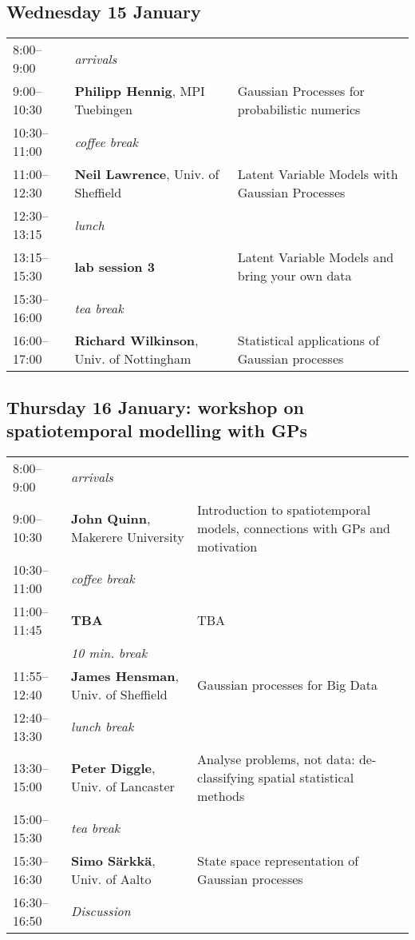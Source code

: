 \documentclass{article}
\begin{document}
\vspace{0.5cm}
\subsection*{\textcolor{MyDarkBlue}{Wednesday 15 January}}
\begin{tabular}{l p{6.5cm} p{7.75cm}}
8:00--9:00   & \textit{arrivals} & \\
9:00--10:30 & \textbf{Philipp Hennig}, MPI Tuebingen  & Gaussian Processes for probabilistic numerics \\
10:30--11:00 & \textit{coffee break} & \\
11:00--12:30 & \textbf{Neil Lawrence}, Univ. of Sheffield  & Latent Variable Models with Gaussian Processes \\
12:30--13:15 & \textit{lunch} & \\
13:15--15:30 & \textbf{lab session 3} & Latent Variable Models and bring your own data \\
15:30--16:00 & \textit{tea break} & \\
16:00--17:00 & \textbf{Richard Wilkinson}, Univ. of Nottingham & Statistical applications of Gaussian processes \\
\end{tabular}

\vspace{1cm}
\subsection*{\textcolor{MyDarkBlue}{Thursday 16 January: workshop on spatiotemporal modelling with GPs}}
\begin{tabular}{l p{6.5cm} p{7.75cm}}
8:00--9:00   & \textit{arrivals} & \\
9:00--10:30 & \textbf{John Quinn}, Makerere University  & Introduction to spatiotemporal models, connections with GPs and motivation \\
10:30--11:00 & \textit{coffee break} & \\
11:00--11:45 & \textbf{TBA} & TBA \\
	     & \textit{10 min. break} & \\
11:55--12:40 & \textbf{James Hensman}, Univ. of Sheffield & Gaussian processes for Big Data \\
12:40--13:30 & \textit{lunch break} & \\
13:30--15:00 & \textbf{Peter Diggle}, Univ. of Lancaster & Analyse problems, not data: de-classifying spatial statistical methods \\
15:00--15:30 & \textit{tea break} & \\
15:30--16:30 & \textbf{Simo S\"arkk\"a}, Univ. of Aalto & State space representation of Gaussian processes \\
16:30--16:50 & \textit{Discussion} & \\
\end{tabular}
\end{document}
